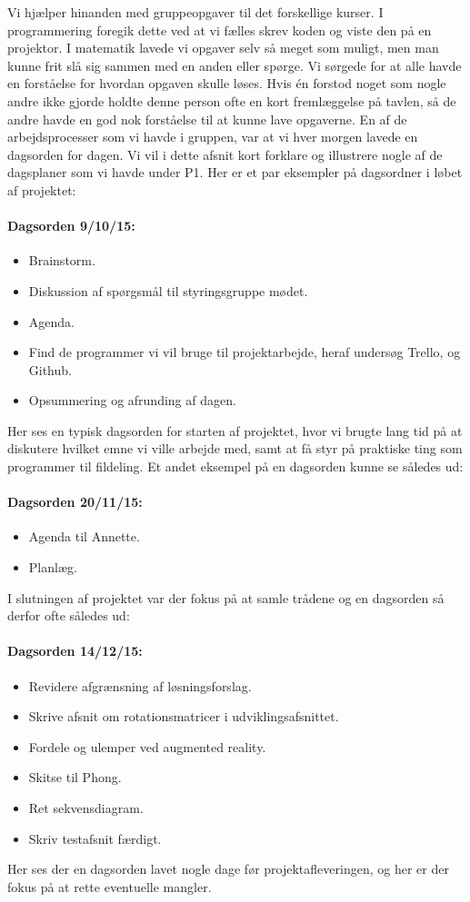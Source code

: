 \documentclass[oneside,a4paper,titlepage]{article}
\begin{document}
Vi hjælper hinanden med gruppeopgaver til det forskellige kurser. I programmering foregik dette ved at vi fælles skrev koden og viste den på en projektor. I matematik lavede vi opgaver selv så meget som muligt, men man kunne frit slå sig sammen med en anden eller spørge. Vi sørgede for at alle havde en forståelse for hvordan opgaven skulle løses. Hvis én forstod noget som nogle andre ikke gjorde holdte denne person ofte en kort fremlæggelse på tavlen, så de andre havde en god nok forståelse til at kunne lave opgaverne. \newline\newline
En af de arbejdsprocesser som vi havde i gruppen, var at vi hver morgen lavede en dagsorden for dagen. Vi vil i dette afsnit kort forklare og illustrere nogle af de dagsplaner som vi havde under P1. 
Her er et par eksempler på dagsordner i løbet af projektet:
\paragraph{Dagsorden 9/10/15:}
\begin{itemize}
  \item Brainstorm.
  \item Diskussion af spørgsmål til styringsgruppe mødet.
  \item Agenda.
  \item Find de programmer vi vil bruge til projektarbejde, heraf undersøg Trello, og Github.
  \item Opsummering og afrunding  af dagen.
\end{itemize}
Her ses en typisk dagsorden for starten af projektet, hvor vi brugte lang tid på at diskutere hvilket emne vi ville arbejde med, samt at få styr på praktiske ting som programmer til fildeling.
Et andet eksempel på en dagsorden kunne se således ud:
\paragraph{Dagsorden 20/11/15:}
\begin{itemize}
  \item Agenda til Annette.
  \item Planlæg.
\end{itemize}
I slutningen af projektet var der fokus på at samle trådene og en dagsorden så derfor ofte således ud:

\paragraph{Dagsorden 14/12/15:}
\begin{itemize}
  \item Revidere afgrænsning af løsningsforslag.
  \item Skrive afsnit om rotationsmatricer i udviklingsafsnittet.
  \item Fordele og ulemper ved augmented reality.
  \item Skitse til Phong.
  \item Ret sekvensdiagram.
  \item Skriv testafsnit færdigt.
\end{itemize}
Her ses der en dagsorden lavet nogle dage før projektafleveringen, og her er der fokus på at rette eventuelle mangler.
\end{document}
